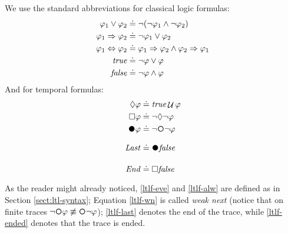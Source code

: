 We use the standard abbreviations for classical logic formulas:
\begin{align*}
	\varphi_1\lor\varphi_2 &\doteq \lnot(\lnot \varphi_1\land \lnot
	\varphi_2)\\
	\varphi_1 \Rightarrow \varphi_2 &\doteq \lnot \varphi_1 \vee \varphi_2\\
	\varphi_1 \Leftrightarrow \varphi_2 &\doteq \varphi_1 \Rightarrow \varphi_2 \wedge \varphi_2 \Rightarrow \varphi_1\\
	\mathit{true}  &\doteq \lnot \varphi \vee \varphi\\
	\mathit{false} &\doteq \lnot \varphi \wedge \varphi\\
\end{align*}
And for temporal formulas:
\begin{align}
\Diamond\varphi &\doteq \true\lUntil\varphi \label{ltlf-eve}\\
\Box\varphi &\doteq\lnot\Diamond\lnot\varphi \label{ltlf-alw}\\
\Wnext \varphi &\doteq \lnot \Next \lnot \varphi \label{ltlf-wn}\\
\Last &\doteq \Wnext\false \label{ltlf-last}\\
\Ended &\doteq \Box\false \label{ltlf-ended}
\end{align}
As the reader might already noticed, \ref{ltlf-eve} and \ref{ltlf-alw} are defined as in Section \ref{sect:ltl-syntax};  Equation \ref{ltlf-wn} is called \emph{weak next} (notice that on finite traces $\lnot \Next \varphi \not\equiv \Next \lnot \varphi$); \ref{ltlf-last} denotes the end of the trace, while \ref{ltlf-ended} denotes that the trace is ended.

